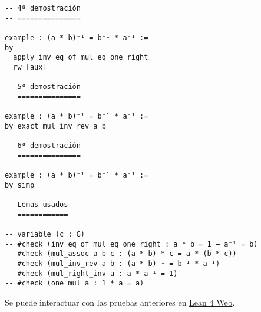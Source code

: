 \begin{verbatim}
-- 4ª demostración
-- ===============

example : (a * b)⁻¹ = b⁻¹ * a⁻¹ :=
by
  apply inv_eq_of_mul_eq_one_right
  rw [aux]

-- 5ª demostración
-- ===============

example : (a * b)⁻¹ = b⁻¹ * a⁻¹ :=
by exact mul_inv_rev a b

-- 6ª demostración
-- ===============

example : (a * b)⁻¹ = b⁻¹ * a⁻¹ :=
by simp

-- Lemas usados
-- ============

-- variable (c : G)
-- #check (inv_eq_of_mul_eq_one_right : a * b = 1 → a⁻¹ = b)
-- #check (mul_assoc a b c : (a * b) * c = a * (b * c))
-- #check (mul_inv_rev a b : (a * b)⁻¹ = b⁻¹ * a⁻¹)
-- #check (mul_right_inv a : a * a⁻¹ = 1)
-- #check (one_mul a : 1 * a = a)
\end{verbatim}
Se puede interactuar con las pruebas anteriores en \href{https://lean.math.hhu.de/\#url=https://raw.githubusercontent.com/jaalonso/Calculemus2/main/src/Inverso\_del\_producto.lean}{Lean 4 Web}.


